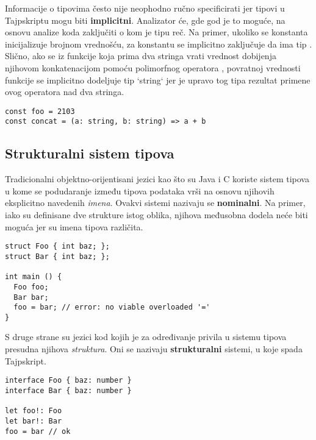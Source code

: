Informacije o tipovima često nije neophodno ručno specificirati jer tipovi u Tajpskriptu mogu biti \textbf{implicitni}.
Analizator će, gde god je to moguće, na osnovu analize koda zaključiti o kom je tipu reč.
Na primer, ukoliko se konstanta inicijalizuje brojnom vrednošću, za konstantu se implicitno zaključuje da ima tip .
Slično, ako se iz funkcije koja prima dva stringa vrati vrednost dobijenja njihovom konkatenacijom pomoću polimorfnog operatora \code{+}, povratnoj vrednosti funkcije se implicitno dodeljuje tip `string` jer je upravo tog tipa rezultat primene ovog operatora nad dva stringa.

\begin{verbatim}
const foo = 2103
const concat = (a: string, b: string) => a + b
\end{verbatim}

\subsection{Strukturalni sistem tipova}

Tradicionalni objektno-orijentisani jezici kao što su Java i C koriste sistem tipova u kome se podudaranje između tipova podataka vrši na osnovu njihovih eksplicitno navedenih \textit{imena}.
Ovakvi sistemi nazivaju se \textbf{nominalni}.
Na primer, iako su definisane dve strukture istog oblika, njihova međusobna dodela neće biti moguća jer su imena tipova različita.

\begin{verbatim}
struct Foo { int baz; };
struct Bar { int baz; };

int main () {
  Foo foo;
  Bar bar;
  foo = bar; // error: no viable overloaded '='
}
\end{verbatim}

S druge strane su jezici kod kojih je za određivanje privila u sistemu tipova presudna njihova \textit{struktura}.
Oni se nazivaju \textbf{strukturalni} sistemi, u koje spada Tajpskript.

\begin{verbatim}
interface Foo { baz: number }
interface Bar { baz: number }

let foo!: Foo
let bar!: Bar
foo = bar // ok
\end{verbatim}
